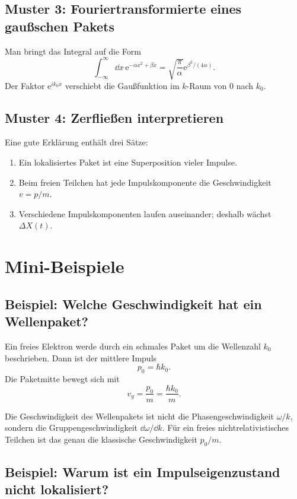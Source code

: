 \subsection{Muster 3: Fouriertransformierte eines gaußschen Pakets}

Man bringt das Integral auf die Form
\[
    \int_{-\infty}^{\infty}\dd x\,\mathrm{e}^{-\alpha x^2+\beta x}
    =\sqrt{\frac{\pi}{\alpha}}\mathrm{e}^{\beta^2/(4\alpha)}.
\]
Der Faktor $\mathrm{e}^{ik_0x}$ verschiebt die Gaußfunktion im $k$-Raum von $0$ nach $k_0$.

\subsection{Muster 4: Zerfließen interpretieren}

Eine gute Erklärung enthält drei Sätze:
\begin{enumerate}
    \item Ein lokalisiertes Paket ist eine Superposition vieler Impulse.
    \item Beim freien Teilchen hat jede Impulskomponente die Geschwindigkeit $v=p/m$.
    \item Verschiedene Impulskomponenten laufen auseinander; deshalb wächst $\Delta X(t)$.
\end{enumerate}

\section{Mini-Beispiele}

\subsection{Beispiel: Welche Geschwindigkeit hat ein Wellenpaket?}

Ein freies Elektron werde durch ein schmales Paket um die Wellenzahl $k_0$ beschrieben. Dann ist der mittlere Impuls
\[
    p_0=\hbar k_0.
\]
Die Paketmitte bewegt sich mit
\[
    v_g=\frac{p_0}{m}=\frac{\hbar k_0}{m}.
\]

\begin{answerbox}
Die Geschwindigkeit des Wellenpakets ist nicht die Phasengeschwindigkeit $\omega/k$, sondern die Gruppengeschwindigkeit $\dd\omega/\dd k$. Für ein freies nichtrelativistisches Teilchen ist das genau die klassische Geschwindigkeit $p_0/m$.
\end{answerbox}

\subsection{Beispiel: Warum ist ein Impulseigenzustand nicht lokalisiert?}

